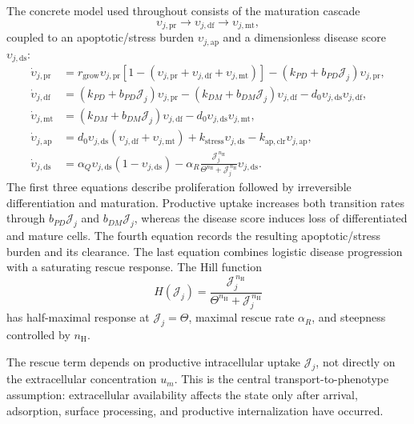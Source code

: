 \documentclass[pdflatex,sn-mathphys-num]{sn-jnl}
\numberwithin{equation}{section}
\theoremstyle{thmstyleone}%
\theoremstyle{definition}
\theoremstyle{remark}
\begin{document}
The concrete model used throughout consists of the maturation cascade
\[
\upsilon_{j,\mathrm{pr}}
\longrightarrow
\upsilon_{j,\mathrm{df}}
\longrightarrow
\upsilon_{j,\mathrm{mt}},
\]
coupled to an apoptotic/stress burden $\upsilon_{j,\mathrm{ap}}$ and a dimensionless disease score $\upsilon_{j,\mathrm{ds}}$: 
\begin{subequations}
\label{eq:transformed_problem}
\begin{align}
\dot\upsilon_{j,\mathrm{pr}}
&=
r_{\mathrm{grow}}\upsilon_{j,\mathrm{pr}}
\left[
1-
\left(
\upsilon_{j,\mathrm{pr}}
+\upsilon_{j,\mathrm{df}}
+\upsilon_{j,\mathrm{mt}}
\right)
\right]
-
(k_{PD}+b_{PD}\mathcal J_j)\upsilon_{j,\mathrm{pr}},\\
\dot\upsilon_{j,\mathrm{df}} &=
(k_{PD}+b_{PD}\mathcal J_j)\upsilon_{j,\mathrm{pr}}
-
(k_{DM}+b_{DM}\mathcal J_j)\upsilon_{j,\mathrm{df}}
-
d_0\upsilon_{j,\mathrm{ds}}\upsilon_{j,\mathrm{df}},\\
\dot\upsilon_{j,\mathrm{mt}} &=
(k_{DM}+b_{DM}\mathcal J_j)\upsilon_{j,\mathrm{df}}
-
d_0\upsilon_{j,\mathrm{ds}}\upsilon_{j,\mathrm{mt}}, \label{eq:state}\\
\dot\upsilon_{j,\mathrm{ap}} &=
d_0\upsilon_{j,\mathrm{ds}}
\left(
\upsilon_{j,\mathrm{df}}
+\upsilon_{j,\mathrm{mt}}
\right)
+
k_{\mathrm{stress}}\upsilon_{j,\mathrm{ds}}
-
k_{\mathrm{ap,clr}}\upsilon_{j,\mathrm{ap}},\\
\dot\upsilon_{j,\mathrm{ds}} &=
\alpha_Q\upsilon_{j,\mathrm{ds}}
(1-\upsilon_{j,\mathrm{ds}})
-
\alpha_R
\frac{\mathcal J_j^{\,n_{\mathrm H}}}
{\Theta^{n_{\mathrm H}}+\mathcal J_j^{\,n_{\mathrm H}}}
\upsilon_{j,\mathrm{ds}}.
\end{align}
\end{subequations}
The first three equations describe proliferation followed by irreversible differentiation and maturation. Productive uptake increases both transition rates through $b_{PD}\mathcal J_j$ and $b_{DM}\mathcal J_j$, whereas the disease score induces loss of differentiated and mature cells. The fourth equation records the resulting apoptotic/stress burden and its clearance. The last equation combines logistic disease progression with a saturating rescue response. The Hill function
\[
H(\mathcal J_j)
=
\frac{\mathcal J_j^{\,n_{\mathrm H}}}
{\Theta^{n_{\mathrm H}}+\mathcal J_j^{\,n_{\mathrm H}}}
\]
has half-maximal response at $\mathcal J_j=\Theta$, maximal rescue rate $\alpha_R$, and steepness controlled by $n_{\mathrm H}$.

The rescue term depends on productive intracellular uptake $\mathcal J_j$, not directly on the extracellular concentration $u_m$. This is the central transport-to-phenotype assumption: extracellular availability affects the state only after arrival, adsorption, surface processing, and productive internalization have occurred.
\end{document}
